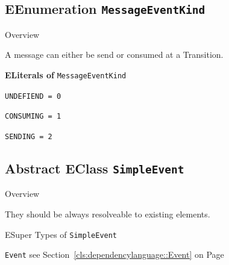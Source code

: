 \subsection{EEnumeration \bfseries \texttt{MessageEventKind}\normalfont}
\label{cls:dependencylanguage::MessageEventKind} 

	\begin{longdescription}
		\item[Overview] 		
				

	

		A message can either be send or consumed at a Transition.		
	
		\item[\textbf{ELiterals of} \texttt{MessageEventKind}] ~
		\begin{longdescription}
			
\item[\texttt{UNDEFIEND = 0}] ~
\nopagebreak

\item[\texttt{CONSUMING = 1}] ~
\nopagebreak

\item[\texttt{SENDING = 2}] ~
\nopagebreak
		\end{longdescription}
	\end{longdescription}
	
	

\subsection{Abstract EClass \bfseries \texttt{SimpleEvent}\normalfont}
\label{cls:dependencylanguage::SimpleEvent} 
	
	\begin{longdescription}
		\item[Overview] 		
				

	

		They should be always resolveable to existing elements.		
		\item[ESuper Types of \texttt{SimpleEvent}] ~
			\begin{longdescription}
				\item[\texttt{Event}] see Section~\ref{cls:dependencylanguage::Event} on Page~\pageref{cls:dependencylanguage::Event}						\end{longdescription}
		
	
	
	\end{longdescription}
	

